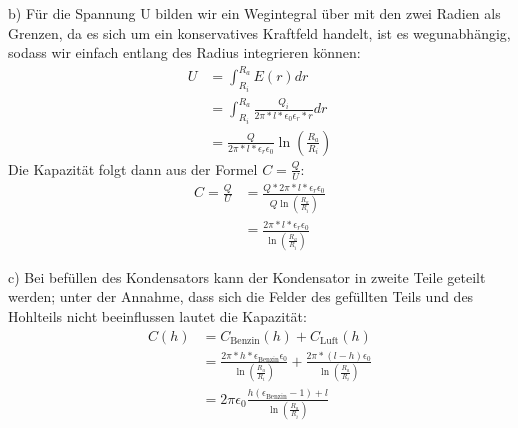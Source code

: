 \documentclass[11pt a4paper]{article}
\newcommand{\epsz}{\epsilon_0}
\begin{document}
\vspace{0.5cm}
\par{b)}
Für die Spannung U bilden wir ein Wegintegral über mit den zwei Radien als 
Grenzen, da es sich um ein konservatives Kraftfeld handelt, ist es 
wegunabhängig, sodass wir einfach entlang des Radius integrieren können:
\begin{align*}
	U &= \int_{R_i}^{R_a} E(r) dr \\
	&= \int_{R_i}^{R_a} \frac{Q_i}{2\pi * l * \epsz \epsilon_r* r} dr \\
	&= \frac{Q}{2\pi * l * \epsilon_r \epsz} \ln\left(\frac{R_a}{R_i}
	\right)
\end{align*}
Die Kapazität folgt dann aus der Formel $C = \frac QU$:
\begin{align*}
	C = \frac QU &= \frac{Q * 2\pi * l * \epsilon_r \epsz}
	{Q \ln\left(\frac{R_a}{R_i}\right)} \\
	&= \frac{2\pi * l * \epsilon_r \epsz}
	{\ln\left(\frac{R_a}{R_i}\right)} 
\end{align*}

\par{c)}
Bei befüllen des Kondensators kann der Kondensator in zweite Teile geteilt
werden; unter der Annahme, dass sich die Felder des gefüllten Teils und des
Hohlteils nicht beeinflussen lautet die Kapazität:
\begin{align*}
	C(h) &= C_\text{Benzin}(h) + C_\text{Luft}(h) \\
	&= \frac{2\pi * h * \epsilon_\text{Benzin} \epsz}
	{\ln\left(\frac{R_a}{R_i}\right)} +
	\frac{2\pi * (l-h)  \epsz}
	{\ln\left(\frac{R_a}{R_i}\right)} \\
	&= 2\pi\epsz \frac{h (\epsilon_\text{Benzin} -1 )+ l}
	{\ln\left(\frac{R_a}{R_i}\right)}
\end{align*}

\newpage
\end{document}
